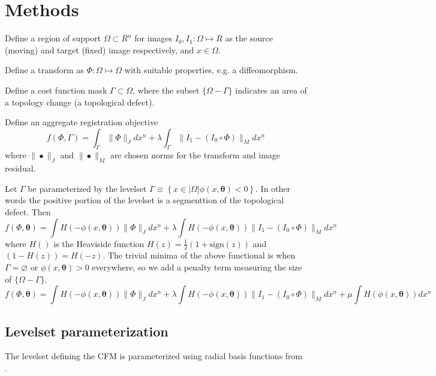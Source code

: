 \documentclass[]{article}
\newcommand{\vect}[1]{\boldsymbol{#1}}
\begin{document}
\section{Methods}
Define a region of support \(\Omega \subset R^n\) for images \(I_0,
I_1 : \Omega \mapsto R\) as the source (moving) and target (fixed)
image respectively, and \(x \in \Omega\).
\par
Define a transform as \(\Phi : \Omega \mapsto \Omega \) with suitable
properties, e.g. a diffeomorphism.
\par
Define a cost function mask \(\Gamma \subset \Omega\), where the subset
\( \{\Omega - \Gamma \}\) indicates an area of a topology change (a
topological defect).
\par
Define an aggregate registration objective
\begin{equation}
f(\Phi,\Gamma) = \int_\Gamma \|\Phi\|_J dx^n + \lambda \int_\Gamma \|
I_1 - (I_0 \circ \Phi) \|_M dx^n
\end{equation}
where \(\|\bullet\|_J\) and \(\|\bullet\|_M\) are chosen norms for the transform and image residual. 
\par
Let \(\Gamma\) be parameterized by the levelset \(\Gamma \equiv \left\{
  x\in |\Omega | \phi(x,\vect{\theta}) < 0 \right\}\). In other words the
positive portion of the levelset is a segmenttion of the topological defect. Then
\begin{equation}
f(\Phi,\vect{\theta}) = \int H(-\phi(x,\vect{\theta}))\|\Phi\|_J dx^n + \lambda \int H(-\phi(x,\vect{\theta}))\|
I_1 - (I_0 \circ \Phi) \|_M dx^n
\end{equation}
where \(H()\) is the Heaviside function \( H(z) =
\frac{1}{2}(1+\mbox{sign}(z)) \) and \( (1-H(z)) = H(-z) \). The trivial minima of the above functional
is when \( \Gamma = \varnothing \) or \(\phi(x,\vect{\theta}) > 0\)
everywhere, so we add a penalty term measuring the size of \(\{\Omega-\Gamma\}\).
\begin{equation}
f(\Phi,\vect{\theta}) = \int H(-\phi(x,\vect{\theta}))\|\Phi\|_J dx^n 
+ \lambda \int H(-\phi(x,\vect{\theta}))\|I_1 - (I_0 \circ \Phi) \|_M dx^n 
+ \mu \int H(\phi(x,\vect{\theta})) dx^n
\end{equation}

\subsection{Levelset parameterization}
The levelset defining the CFM is parameterized using radial basis
functions from \cite{Aghasi2011}.
\end{document}
